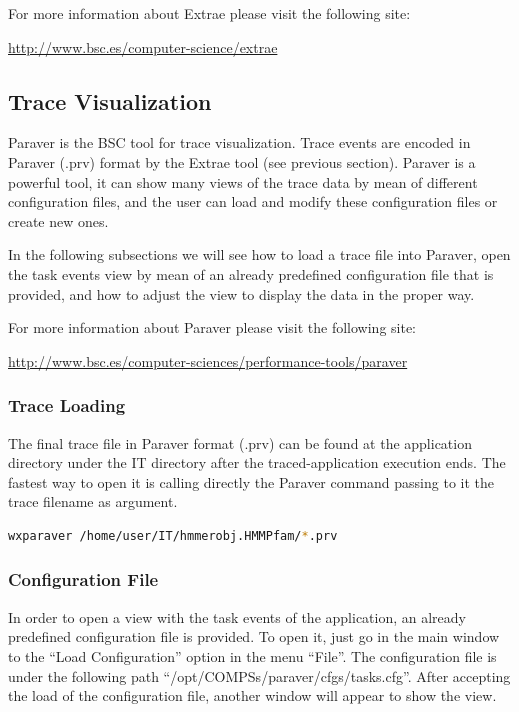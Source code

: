 For more information about Extrae please visit the following site: 
\begin{center}
\url{http://www.bsc.es/computer-science/extrae} 
\end{center}


\subsection{Trace Visualization}

Paraver is the BSC tool for trace visualization. Trace events are encoded in Paraver (.prv) format by the Extrae tool (see previous section). Paraver is a powerful tool, it can show many views of the trace data by mean of different configuration files, and the user can load and modify these configuration files or create new ones.

In the following subsections we will see how to load a trace file into Paraver, open the task events view by mean of an already predefined configuration file that is provided, and how to adjust the view to display the data in the proper way.

For more information about Paraver please visit the following site:

\begin{center}
\url{http://www.bsc.es/computer-sciences/performance-tools/paraver}
\end{center}

\subsubsection{Trace Loading}

The final trace file in Paraver format (.prv) can be found at the application directory under the IT directory after the traced-application execution ends. The fastest way to open it is calling directly the Paraver command passing to it the trace filename as argument.

\begin{lstlisting}[language=bash]
wxparaver /home/user/IT/hmmerobj.HMMPfam/*.prv
\end{lstlisting}
 
\subsubsection{Configuration File}
In order to open a view with the task events of the application, an already predefined configuration file is provided. To open it, just go in the main window to the ``Load Configuration'' option in the menu ``File''. The configuration file is under the following path ``/opt/COMPSs/paraver/cfgs/tasks.cfg''. After accepting the load of the configuration file, another window will appear to show the view.

